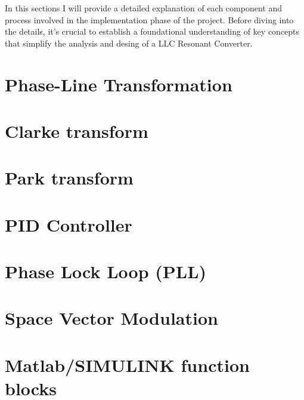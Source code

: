 In this sections I will provide a detailed explanation of each component and
process involved in the implementation phase of the project. Before diving into
the details, it's crucial to establish a foundational understanding of key
concepts that simplify the analysis and desing of a LLC Resonant Converter.

\section{Phase-Line Transformation}

\section{Clarke transform}

\section{Park transform}

\section{PID Controller}

\section{Phase Lock Loop (PLL)}

\section{Space Vector Modulation}

\section{Matlab/SIMULINK function blocks}

